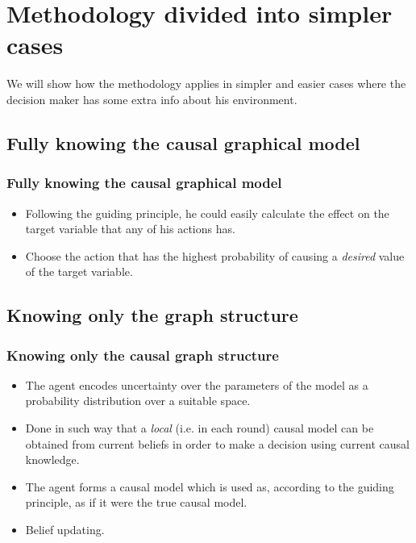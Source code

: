 \documentclass{beamer}
\theoremstyle{plain}
\begin{document}
\section{Methodology divided into simpler cases}
\begin{frame}
We will show how the methodology applies in simpler and easier cases where the decision maker has some extra info about his environment.
\end{frame}
\subsection{Fully knowing the causal graphical model}
\begin{frame}
\frametitle{Fully knowing the causal graphical model}
\begin{itemize}
\item Following the guiding principle, he could easily calculate the effect on the target variable that any of his actions has.
\item Choose the action that has the highest probability of causing a \textit{desired} value of the target variable.
\end{itemize}
\end{frame}

\subsection{Knowing only the graph structure}
\begin{frame}
\frametitle{Knowing only the causal graph structure}
\begin{itemize}
\item The agent encodes uncertainty over the parameters of the model as a probability distribution over a suitable space.
\item Done in such way that a \textit{local} (i.e. in each round) causal model can be obtained from current beliefs in order to make a decision using current causal knowledge.
\item The agent forms a causal model which is used as, according to the guiding principle, as if it were the true causal model.
\item Belief updating.
\end{itemize}
\end{frame}
\end{document}
